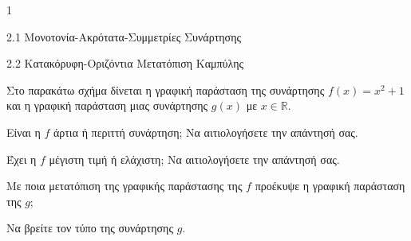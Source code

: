 \begin{ylh}{1}
\item 2.1 Μονοτονία-Ακρότατα-Συμμετρίες Συνάρτησης
\item 2.2 Κατακόρυφη-Οριζόντια Μετατόπιση Καμπύλης
\end{ylh}
Στο παρακάτω σχήμα δίνεται η γραφική παράσταση της συνάρτησης $f(x) = x^2 + 1$ και η γραφική παράσταση μιας συνάρτησης $g(x)$ με $x \in \mathbb{R}$.
\begin{center}
\end{center}
\begin{alist}
\item \begin{rlist}
\item Είναι η $f$ άρτια ή περιττή συνάρτηση; Να αιτιολογήσετε την απάντησή σας. 
\item Έχει η $f$ μέγιστη τιμή ή ελάχιστη; Να αιτιολογήσετε την απάντησή σας. 
\end{rlist}
\item \begin{rlist}
\item Με ποια μετατόπιση της γραφικής παράστασης της $f$ προέκυψε η γραφική παράσταση της $g$; 
\item Να βρείτε τον τύπο της συνάρτησης $g$. 
\end{rlist}
\end{alist}

